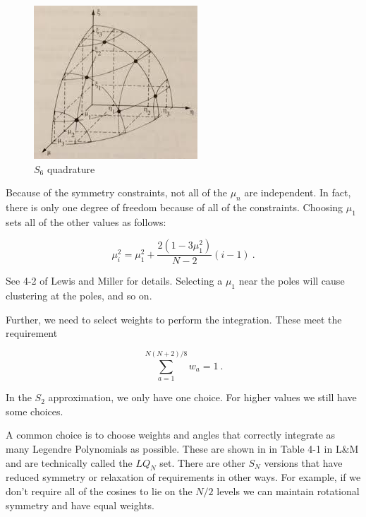 \documentclass[12pt]{article}
\begin{document}
\begin{figure}[h!]
    \begin{center}
    \includegraphics[keepaspectratio, width = 2.5 in]{level-sym}
    \end{center}
    \caption{$S_6$ quadrature}
    \label{fig:levelsym}
\end{figure}

Because of the symmetry constraints, not all of the $\mu_n$ are independent. In 
fact, there is only one degree of freedom because of all of the constraints. 
Choosing $\mu_1$ sets all of the other values as follows:

\[
\mu_i^2 = \mu_1^2 + \frac{2(1 - 3\mu_1^2)}{N-2}(i-1)\:.
\]

See 4-2 of Lewis and Miller for details. Selecting a $\mu_1$ near the poles 
will cause clustering at the poles, and so on. 

Further, we need to select weights to perform the integration. These meet the 
requirement

\[
\sum_{a=1}^{N(N+2)/8} w_a = 1\:.
\]

In the $S_2$ approximation, we only have one choice. For higher values we 
still have some choices. 

A common choice is to choose weights and angles that correctly integrate as 
many Legendre Polynomials as possible. These are shown in in Table 4-1 in L\&M 
and are technically called the $LQ_N$ set. There are other $S_N$ versions that 
have reduced symmetry or relaxation of requirements in other ways. For 
example, if we don't require all of the cosines to lie on the $N/2$ levels we 
can maintain rotational symmetry and have equal weights. 
\end{document}
